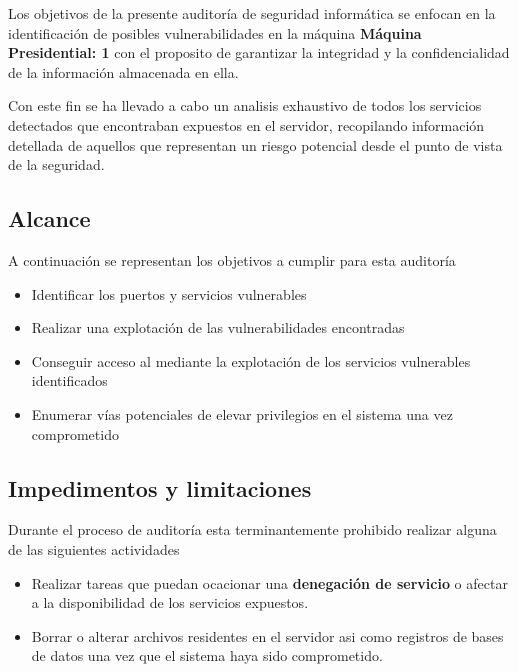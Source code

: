 \documentclass[a4paper]{article}
\newcommand{\machineName}{Máquina Presidential: 1}
\begin{document}
  Los objetivos de la presente auditoría de seguridad informática se enfocan en la identificación
  de posibles vulnerabilidades en la máquina \textbf{\color{bluePortada}\machineName} con el proposito
  de garantizar la integridad y la confidencialidad de la información almacenada en ella.
  
  Con este fin se ha llevado a cabo un analisis exhaustivo de todos los servicios detectados que
  encontraban expuestos en el servidor, recopilando información detellada de aquellos que representan un
  riesgo potencial desde el punto de vista de la seguridad.
  
\clearpage


\subsection{Alcance}                 %

A continuación se representan los objetivos a cumplir para esta auditoría
\begin{itemize}
  \item Identificar los puertos y servicios vulnerables
  \item Realizar una explotación de las vulnerabilidades encontradas
  \item Conseguir acceso al mediante la explotación de los servicios vulnerables identificados
  \item Enumerar vías potenciales de elevar privilegios en el sistema una vez comprometido
\end{itemize}


\subsection{Impedimentos y limitaciones}

Durante el proceso de auditoría esta terminantemente prohibido realizar alguna de las siguientes
actividades
\begin{itemize}
  \item Realizar tareas que puedan ocacionar una \textbf{denegación de servicio} o afectar a la
  disponibilidad de los servicios expuestos.
  \item Borrar o alterar archivos residentes en el servidor asi como registros de bases de datos una vez que el sistema haya sido comprometido.
\end{itemize}
\end{document}
